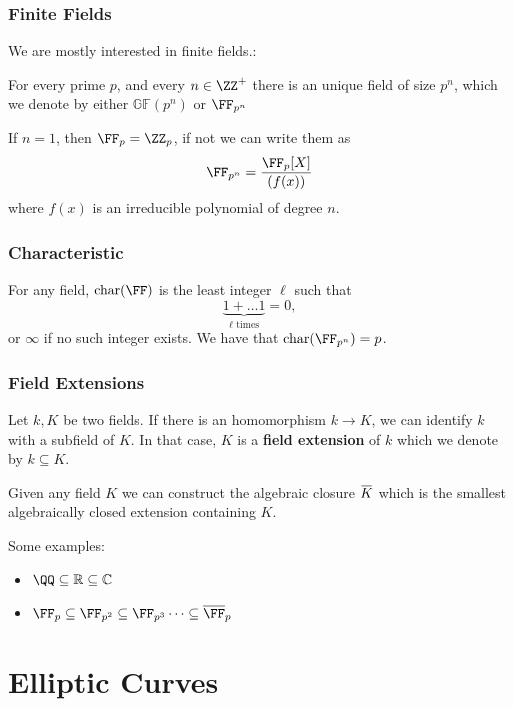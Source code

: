 \documentclass{beamer}
\newcommand{\overbar}[1]{\mkern 1.5mu\overline{\mkern-1.5mu#1\mkern-1.5mu}\mkern 1.5mu}
\begin{document}
\begin{frame}
    \frametitle{Finite Fields}
    We are mostly interested in finite fields.:
    \begin{theorem}
        For every prime $p$, and every $n \in \ZZ^+$ there is an unique field of size $p^n$, which we denote 
        by either $\mathbb{GF}(p^n)$ or $\FF_{p^n}$
    \end{theorem}
    \pause
    
    If $n = 1$, then $\FF_{p} = \ZZ_p$, if not we can write them as
    \[ \FF_{p^n} = \frac{\FF_{p}[X]}{(f(x))} \]
    where $f(x)$ is an irreducible polynomial of degree $n$.
\end{frame}

\begin{frame}
    \frametitle{Characteristic}
    For any field, $\mathrm{char}(\FF)$ is the least integer $\ell$ such that 
    \[ \underbrace{1 + \dots 1}_{\ell \text{ times}} = 0, \]
    or $\infty$ if no such integer exists.
    We have that $\mathrm{char}(\FF_{p^n}) = p$. 
\end{frame}

\begin{frame}
    \frametitle{Field Extensions}
    Let $k, K$ be two fields. If there is an homomorphism $k \to K$, we can identify $k$ with a subfield of $K$. 
    In that case, $K$ is a \textbf{field extension} of $k$ which we denote by $k \subseteq K$. 
    
    \pause
    Given any field $K$ we can construct the algebraic closure $\overbar{K}$ which is the smallest algebraically closed extension containing $K$.

    Some examples:
    \begin{itemize}
        \item<1-> $\QQ \subseteq \mathbb{R} \subseteq \mathbb{C}$
        \item<2-> $\FF_p \subseteq \FF_{p^2} \subseteq \FF_{p^3} \dots \subseteq \overline{\FF}_{p}$
    \end{itemize}
\end{frame}

\section{Elliptic Curves}
\end{document}
